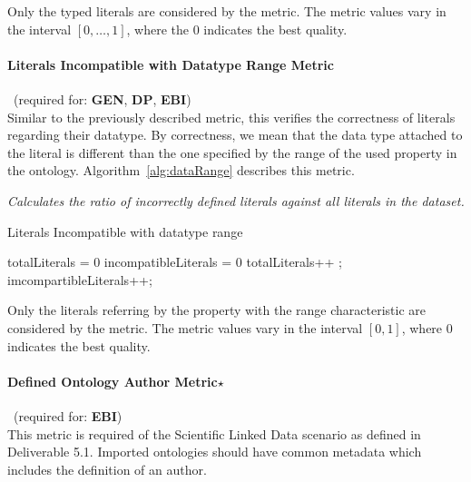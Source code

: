 Only the typed literals are considered by the metric. 
The metric values vary in the interval $[0,\ldots,1]$, where the 0 indicates the best quality.

\paragraph{Literals Incompatible with Datatype Range Metric}~(required for: \textbf{GEN}, \textbf{DP}, \textbf{EBI})~\\
Similar to the previously described metric, this verifies the correctness of literals regarding their datatype. 
By correctness, we mean that the data type attached to the literal is different than the one specified by the range of the used property in the ontology.
Algorithm~\ref{alg:dataRange} describes this metric.
\begin{mdframed}[style=metricdefinition]
\emph{Calculates the ratio of incorrectly defined literals against all literals in the dataset.}
\end{mdframed}

\begin{algorithm}
\caption{Literals Incompatible with datatype range}\label{alg:dataRange}
\begin{algorithmic}[1]
\State totalLiterals = 0
\State incompatibleLiterals = 0
\EndProcedure
{}
 totalLiterals++ ;
 imcompartibleLiterals++; 
\EndIf
\EndIf
\EndProcedure
\end{algorithmic}
\end{algorithm}

Only the literals referring by the property with the range characteristic are considered by the metric. 
The metric values vary in the interval $[0, 1]$, where  0 indicates the best quality.

\paragraph{Defined Ontology Author Metric$\star$}~(required for: \textbf{EBI})~\\ 
This metric is required of the Scientific Linked Data scenario as defined in Deliverable 5.1.
Imported ontologies should have common metadata which includes the definition of an author.

